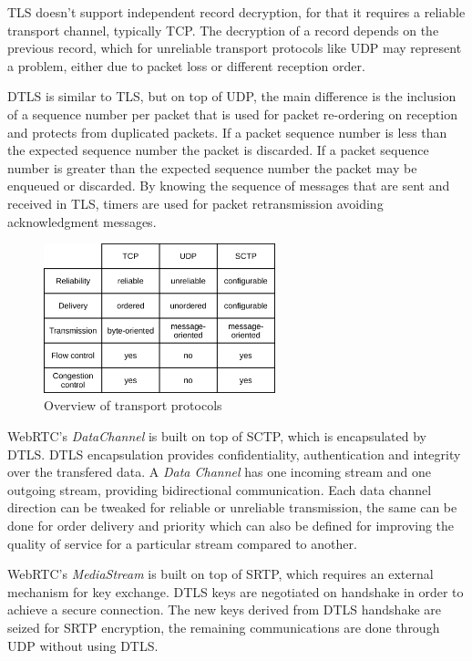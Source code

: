 \ac{TLS} doesn't support independent record decryption, for that it requires a reliable transport channel, typically \ac{TCP}. The decryption of a record depends on the previous record, which for unreliable transport protocols like \ac{UDP} may represent a problem, either due to packet loss or different reception order.

\ac{DTLS} is similar to \ac{TLS}, but on top of \ac{UDP}, the main difference is the inclusion of a sequence number per packet that is used for packet re-ordering on reception and protects from duplicated packets. If a packet sequence number is less than the expected sequence number the packet is discarded. If a packet sequence number is greater than the expected sequence number the packet may be enqueued or discarded. By knowing the sequence of messages that are sent and received in \ac{TLS}, timers are used for packet retransmission avoiding acknowledgment messages.

\begin{figure}[H]
	\centering
	\includegraphics[width=0.6\textwidth]{figures/basic_protocols.png}
	\caption{Overview of transport protocols}
\end{figure}

\ac{WebRTC}'s \textit{DataChannel} is built on top of \ac{SCTP}, which is encapsulated by \ac{DTLS}. \ac{DTLS} encapsulation provides confidentiality, authentication and integrity over the transfered data. A \textit{Data Channel} has one incoming stream and one outgoing stream, providing bidirectional communication. Each data channel direction can be tweaked for reliable or unreliable transmission, the same can be done for order delivery and priority which can also be defined for improving the quality of service for a particular stream compared to another.

\ac{WebRTC}'s \textit{MediaStream} is built on top of \ac{SRTP}, which requires an external mechanism for key exchange. \ac{DTLS} keys are negotiated on handshake in order to achieve a secure connection. The new keys derived from \ac{DTLS} handshake are seized for \ac{SRTP} encryption, the remaining communications are done through \ac{UDP} without using \ac{DTLS}.

